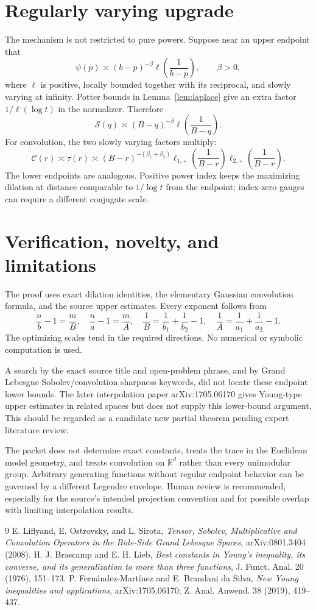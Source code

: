 \documentclass[11pt]{article}
\newcommand{\R}{\mathbb R}
\begin{document}
\section{Regularly varying upgrade}
The mechanism is not restricted to pure powers. Suppose near an upper
endpoint that
\[
 \psi(p)\asymp(b-p)^{-\beta}\ell\!\left(\frac1{b-p}\right),
 \qquad \beta>0,
 \tag{7}
\]
where $\ell$ is positive, locally bounded together with its reciprocal, and
slowly varying at infinity. Potter bounds in Lemma~\ref{lem:laplace} give an
extra factor $1/\ell(\log t)$ in the normalizer. Therefore
\[
 \mathcal S(q)\asymp
 (B-q)^{-\beta}\ell\!\left(\frac1{B-q}\right).
\]
For convolution, the two slowly varying factors multiply:
\[
 \mathcal C(r)\asymp\tau(r)\asymp
 (B-r)^{-(\beta_1+\beta_2)}
 \ell_{1,+}\!\left(\frac1{B-r}\right)
 \ell_{2,+}\!\left(\frac1{B-r}\right).
\]
The lower endpoints are analogous. Positive power index keeps the maximizing
dilation at distance comparable to $1/\log t$ from the endpoint; index-zero
gauges can require a different conjugate scale.

\section{Verification, novelty, and limitations}
The proof uses exact dilation identities, the elementary Gaussian convolution
formula, and the source upper estimates. Every exponent follows from
\[
 \frac nb-1=\frac mB,\quad
 \frac na-1=\frac mA,\quad
 \frac1B=\frac1{b_1}+\frac1{b_2}-1,\quad
 \frac1A=\frac1{a_1}+\frac1{a_2}-1.
\]
The optimizing scales tend in the required directions. No numerical or
symbolic computation is used.

A search by the exact source title and open-problem phrase, and by Grand
Lebesgue Sobolev/convolution sharpness keywords, did not locate these endpoint
lower bounds. The later interpolation paper arXiv:1705.06170 gives Young-type
upper estimates in related spaces but does not supply this lower-bound
argument. This should be regarded as a candidate new partial theorem pending
expert literature review.

The packet does not determine exact constants, treats the trace in the
Euclidean model geometry, and treats convolution on $\R^d$ rather than every
unimodular group. Arbitrary generating functions without regular endpoint
behavior can be governed by a different Legendre envelope. Human review is
recommended, especially for the source's intended projection convention and
for possible overlap with limiting interpolation results.

\begin{thebibliography}{9}
E. Liflyand, E. Ostrovsky, and L. Sirota,
\emph{Tensor, Sobolev, Multiplicative and Convolution Operators in the
Bide-Side Grand Lebesque Spaces}, arXiv:0801.3404 (2008).
H. J. Brascamp and E. H. Lieb,
\emph{Best constants in Young's inequality, its converse, and its
generalization to more than three functions}, J. Funct. Anal. 20 (1976),
151--173.
P. Fern\'andez-Mart\'inez and E. Brandani da Silva,
\emph{New Young inequalities and applications}, arXiv:1705.06170;
Z. Anal. Anwend. 38 (2019), 419--437.
\end{thebibliography}
\end{document}
